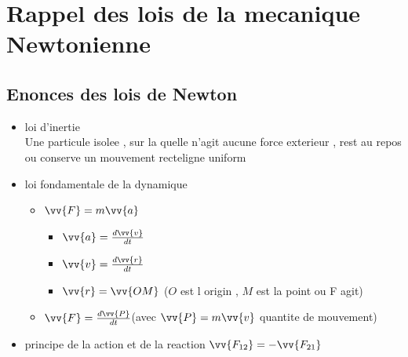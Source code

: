 \documentclass[12pt]{book}
\begin{document}
    \chapter{Rappel des lois de la mecanique Newtonienne}
        \section{Enonces des lois de Newton}
            \begin{itemize}
                \item loi d'inertie 
                    \\ Une particule isolee , sur la quelle n'agit aucune force exterieur , rest au repos ou conserve un mouvement recteligne uniform
                    \begin{center}
                    \end{center}
                \item loi fondamentale de la dynamique 
                    \begin{itemize}
                        \item $\vv{F} = m\vv{a}$
                            \begin{itemize}
                                \item $\vv{a} = \frac{d\vv{v}}{dt}$
                                \item $\vv{v} = \frac{d\vv{r}}{dt} $
                                \item $\vv{r} = \vv{OM} $ ($O$ est l origin , $M$ est la point ou F agit)
                            \end{itemize}
                        \item $\vv{F} = \frac{d\vv{P}}{dt}$(avec $\vv{P} = m\vv{v} $ quantite de mouvement)
                    \end{itemize}
                \item principe de la action et de la reaction $\vv{F_{12}} = -\vv{F_{21}}$
            \end{itemize}
            \pagebreak
\end{document}
